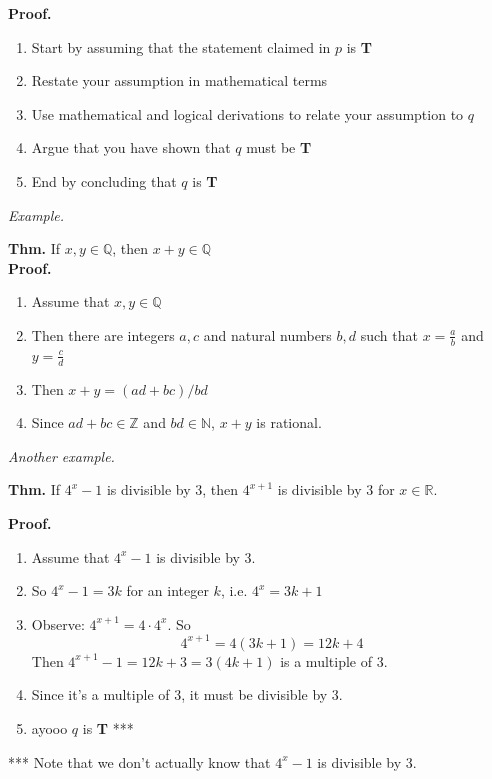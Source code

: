\documentclass{article}
\begin{document}
\textbf{Proof.}

\begin{enumerate}
\item Start by assuming that the statement claimed in $p$ is \textbf{T} 
\item Restate your assumption in mathematical terms 
\item Use mathematical and logical derivations to relate your assumption to $q$ 
\item Argue that you have shown that $q$ must be \textbf{T} 
\item End by concluding that $q$ is \textbf{T}
\end{enumerate}

\noindent\textit{Example.}

\textbf{Thm. } If $x, y \in \mathbb{Q}$, then $x + y \in \mathbb{Q}$ \\

\textbf{Proof.} 
\begin{enumerate}
\item Assume that $x,y \in \mathbb{Q}$
\item Then there are integers $a, c$ and natural numbers $b, d$ such that $x = \frac{a}{b}$ and $y = \frac{c}{d}$
\item Then $x + y = (ad + bc)/bd$
\item Since $ad + bc \in \mathbb{Z}$ and $bd \in \mathbb{N}$, $x+y$ is rational.
\end{enumerate}

\noindent\textit{Another example.}

\textbf{Thm.} If $4^x - 1$ is divisible by 3, then $4^{x+1}$ is divisible by 3 for $x \in \mathbb{R}$.

\textbf{Proof.}

\begin{enumerate}
\item Assume that $4^x-1$ is divisible by 3.
\item So $4^x-1 = 3k$ for an integer $k$, i.e. $4^x = 3k+1$
\item Observe: $4^{x+1} = 4 \cdot 4^x$. So $$4^{x+1} = 4(3k+1) = 12k + 4$$ Then $4^{x+1}-1 = 12k + 3 = 3(4k+1)$ is a multiple of 3.
\item Since it's a multiple of 3, it must be divisible by 3.
\item ayooo $q$ is \textbf{T} ***
\end{enumerate}

*** Note that we don't actually know that $4^x -1$ is divisible by 3.
\end{document}
